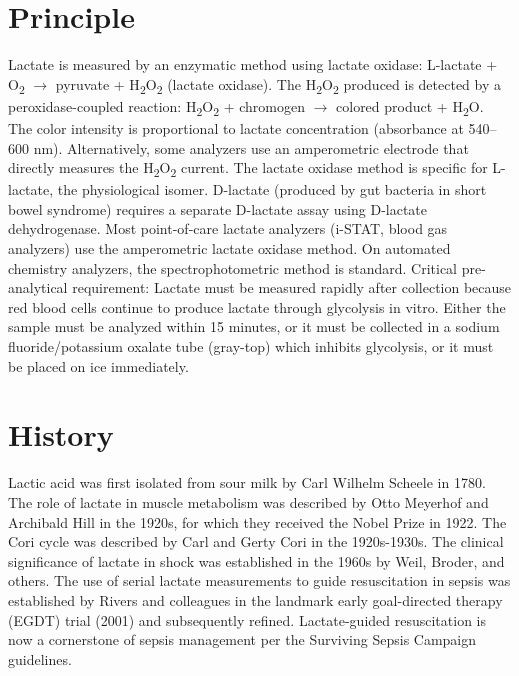 \section*{Principle}
Lactate is measured by an enzymatic method using lactate oxidase: L-lactate + O\textsubscript{2} $\rightarrow$ pyruvate + H\textsubscript{2}O\textsubscript{2} (lactate oxidase). The H\textsubscript{2}O\textsubscript{2} produced is detected by a peroxidase-coupled reaction: H\textsubscript{2}O\textsubscript{2} + chromogen $\rightarrow$ colored product + H\textsubscript{2}O. The color intensity is proportional to lactate concentration (absorbance at 540--600 nm). Alternatively, some analyzers use an amperometric electrode that directly measures the H\textsubscript{2}O\textsubscript{2} current. The lactate oxidase method is specific for L-lactate, the physiological isomer. D-lactate (produced by gut bacteria in short bowel syndrome) requires a separate D-lactate assay using D-lactate dehydrogenase. Most point-of-care lactate analyzers (i-STAT, blood gas analyzers) use the amperometric lactate oxidase method. On automated chemistry analyzers, the spectrophotometric method is standard. Critical pre-analytical requirement: Lactate must be measured rapidly after collection because red blood cells continue to produce lactate through glycolysis in vitro. Either the sample must be analyzed within 15 minutes, or it must be collected in a sodium fluoride/potassium oxalate tube (gray-top) which inhibits glycolysis, or it must be placed on ice immediately.

\section*{History}
Lactic acid was first isolated from sour milk by Carl Wilhelm Scheele in 1780. The role of lactate in muscle metabolism was described by Otto Meyerhof and Archibald Hill in the 1920s, for which they received the Nobel Prize in 1922. The Cori cycle was described by Carl and Gerty Cori in the 1920s-1930s. The clinical significance of lactate in shock was established in the 1960s by Weil, Broder, and others. The use of serial lactate measurements to guide resuscitation in sepsis was established by Rivers and colleagues in the landmark early goal-directed therapy (EGDT) trial (2001) \cite{rivers2001early} and subsequently refined. Lactate-guided resuscitation is now a cornerstone of sepsis management per the Surviving Sepsis Campaign guidelines.

